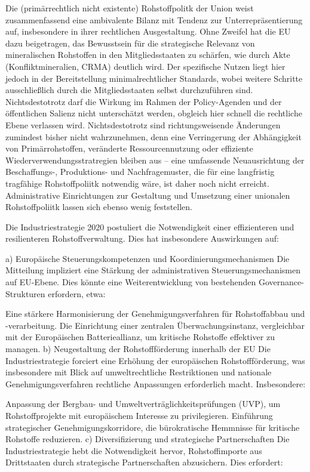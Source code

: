 \documentclass[12pt,a4paper,oneside]{book} %
\begin{document}
Die (primärrechtlich nicht existente) Rohstoffpolitk der Union weist zusammenfassend eine ambivalente Bilanz mit Tendenz zur Unterrepräsentierung auf, insbesondere in ihrer rechtlichen Ausgestaltung. Ohne Zweifel hat die EU dazu beigetragen, das Bewusstsein für die strategische Relevanz von mineralischen Rohstoffen in den Mitgliedsstaaten zu schärfen, wie durch Akte (Konfliktmineralien, CRMA) deutlich wird. Der spezifische Nutzen liegt hier jedoch in der Bereitstellung minimalrechtlicher Standards, wobei weitere Schritte ausschließlich durch die Mitgliedsstaaten selbst durchzuführen sind. Nichtsdestotrotz darf die Wirkung im Rahmen der Policy-Agenden und der öffentlichen Salienz nicht unterschätzt werden, obgleich hier schnell die rechtliche Ebene verlassen wird. Nichtsdestotrotz sind richtungsweisende Änderungen zumindest bisher nicht wahrzunehmen, denn eine Verringerung der Abhängigkeit von Primärrohstoffen, veränderte Ressourcennutzung oder effiziente Wiederverwendungsstratregien bleiben aus -- eine umfassende Neuausrichtung der Beschaffungs-, Produktions- und Nachfragemuster, die für eine langfristig tragfähige Rohstoffpoliitk notwendig wäre, ist daher noch nicht erreicht. Administrative Einrichtungen zur Gestaltung und Umsetzung einer unionalen Rohstoffpoliitk lassen sich ebenso wenig feststellen.

Die Industriestrategie 2020 postuliert die Notwendigkeit einer effizienteren und resilienteren Rohstoffverwaltung. Dies hat insbesondere Auswirkungen auf:

a) Europäische Steuerungskompetenzen und Koordinierungsmechanismen
Die Mitteilung impliziert eine Stärkung der administrativen Steuerungsmechanismen auf EU-Ebene. Dies könnte eine Weiterentwicklung von bestehenden Governance-Strukturen erfordern, etwa:

Eine stärkere Harmonisierung der Genehmigungsverfahren für Rohstoffabbau und -verarbeitung.
Die Einrichtung einer zentralen Überwachungsinstanz, vergleichbar mit der Europäischen Batterieallianz, um kritische Rohstoffe effektiver zu managen.
b) Neugestaltung der Rohstoffförderung innerhalb der EU
Die Industriestrategie forciert eine Erhöhung der europäischen Rohstoffförderung, was insbesondere mit Blick auf umweltrechtliche Restriktionen und nationale Genehmigungsverfahren rechtliche Anpassungen erforderlich macht. Insbesondere:

Anpassung der Bergbau- und Umweltverträglichkeitsprüfungen (UVP), um Rohstoffprojekte mit europäischem Interesse zu privilegieren.
Einführung strategischer Genehmigungskorridore, die bürokratische Hemmnisse für kritische Rohstoffe reduzieren.
c) Diversifizierung und strategische Partnerschaften
Die Industriestrategie hebt die Notwendigkeit hervor, Rohstoffimporte aus Drittstaaten durch strategische Partnerschaften abzusichern. Dies erfordert:
\end{document}
